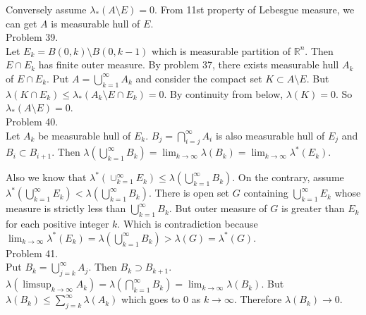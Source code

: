 Conversely assume $\lambda_{*}(A\setminus E) = 0$. From 11st property of Lebesgue measure, we can get $A$ is measurable hull of $E$.\\

Problem 39. \\

Let $E_k = B(0, k) \setminus B(0, k-1)$ which is measurable partition of $\mathbb{R}^n$. Then $E \cap E_k$ has finite outer measure. By problem 37, there exists measurable hull $A_k$ of $E \cap E_k$. Put $A = \bigcup_{k=1}^{\infty}A_k$ and consider the compact set $K \subset A \setminus E$. But $\lambda(K \cap E_k ) \leq \lambda_{*}(A_k \setminus E\cap E_k) = 0$. By continuity from below, $\lambda(K) = 0$. So $\lambda_{*}(A\setminus E) = 0$.\\

Problem 40. \\

Let $A_{k}$ be measurable hull of $E_{k}$. $B_j = \bigcap_{i=j}^{\infty}A_{i}$ is also measurable hull of $E_{j}$ and $B_{i} \subset B_{i+1}$. Then $\lambda \left ( \bigcup_{k=1}^{\infty}B_{k}\right ) = \lim_{k\rightarrow \infty } \lambda \left ( B_{k} \right ) = \lim_{k\rightarrow \infty} \lambda^{*} \left ( E_k \right ) $.

Also we know that $\lambda^{*} \left ( \cup_{k=1}^{\infty} E_k \right ) \leq \lambda \left ( \bigcup_{k=1}^{\infty} B_{k} \right )$.
On the contrary, assume $\lambda^{*}\left ( \bigcup_{k=1}^{\infty}E_{k} \right ) < \lambda \left ( \bigcup_{k=1}^{\infty}B_{k}\right )$. There is open set $G$ containing $\bigcup_{k=1}^{\infty}E_k$ whose measure is strictly less than $\bigcup_{k=1}^{\infty}B_{k}$. But outer measure of $G$ is greater than $E_{k}$ for each positive integer $k$. Which is contradiction because $\lim_{k\rightarrow \infty}\lambda^{*}\left ( E_k \right ) = \lambda\left ( \bigcup_{k=1}^{\infty}B_{k} \right ) > \lambda \left (G \right ) = \lambda^{*}\left ( G \right )$. \\

Problem 41. \\

Put $B_{k} = \bigcup_{j=k}^{\infty}A_{j}$. Then $B_k \supset B_{k+1}$. $\lambda\left ( \limsup_{k\rightarrow \infty}A_{k} \right ) = \lambda \left ( \bigcap_{k=1}^{\infty}B_k \right ) = \lim_{k\rightarrow \infty}\lambda\left ( B_{k} \right )$. But $\lambda\left ( B_k \right ) \leq \sum_{j=k}^{\infty}\lambda \left ( A_{k} \right )$ which goes to $0$ as $k \rightarrow \infty$. Therefore $\lambda \left ( B_{k} \right ) \rightarrow 0$. \\

